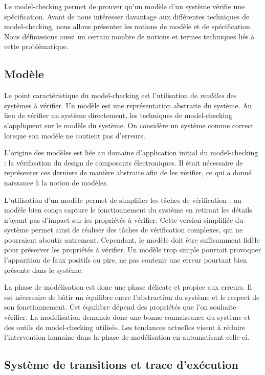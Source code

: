 Le model-checking permet de prouver qu'un modèle d'un système vérifie une
spécification. Avant de nous intéresser davantage aux différentes techniques de
model-checking, nous allons présenter les notions de modèle et de spécification.
Nous définissions aussi un certain nombre de notions et termes techniques liés à
cette problématique.

\subsection{Modèle}

Le point caractéristique du model-checking est l'utilisation de
\emph{modèles} des systèmes à vérifier. Un modèle est une représentation
abstraite du système. Au lieu de vérifier un système directement, les techniques
de model-checking s'appliquent sur le modèle du système. On considère un
système comme correct lorsque son modèle ne contient pas d'erreurs.

L'origine des modèles est liée au domaine d'application initial du
model-checking : la vérification du design de composants électroniques. Il
était nécessaire de représenter ces derniers de manière abstraite afin de les
vérifier, ce qui a donné naissance à la notion de modèles.

L'utilisation d'un modèle permet de simplifier les tâches de vérification : un
modèle bien conçu capture le fonctionnement du système en retirant les détails
n'ayant pas d'impact sur les propriétés à vérifier. Cette version simplifiée du
système permet ainsi de réaliser des tâches de vérification complexes, qui ne
pourraient aboutir autrement. Cependant, le modèle doit être suffisamment fidèle
pour préserver les propriétés à vérifier. Un modèle trop simple pourrait
provoquer l'apparition de faux positifs ou pire, ne pas contenir une erreur
pourtant bien présente dans le système.

La phase de modélisation est donc une phase délicate et propice aux erreurs. Il
est nécessaire de bâtir un équilibre entre l'abstraction du système et le
respect de son fonctionnement. Cet équilibre dépend des propriétés que l'on
souhaite vérifier. La modélisation demande donc une bonne connaissance
du système et des outils de model-checking utilisés. Les tendances actuelles
visent à réduire l'intervention humaine dans la phase de modélisation en
automatisant celle-ci.

\subsection{Système de transitions et trace d'exécution}

